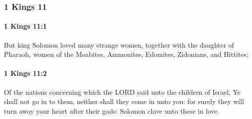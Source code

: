 	\subsubsection{1 Kings 11} %
		\label{1KINGS-11}

		\paragraph{1 Kings 11:1} %
			\label{1KINGS-11-1}

			But king Solomon loved many strange women, together with the daughter of Pharaoh, women of the Moabites, Ammonites, Edomites, Zidonians, and Hittites;


		\paragraph{1 Kings 11:2} %
			\label{1KINGS-11-2}

			Of the nations concerning which the LORD said unto the children of Israel, Ye shall not go in to them, neither shall they come in unto you: for surely they will turn away your heart after their gods: Solomon clave unto these in love.

